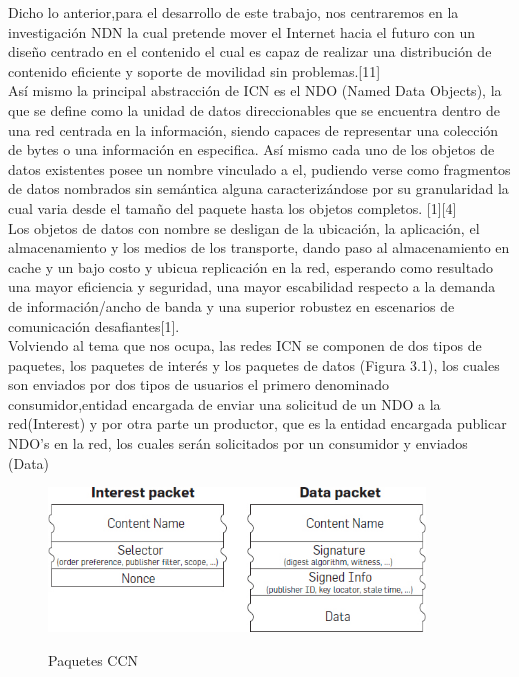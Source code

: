 \documentclass[12pt]{ociamthesis}  %
\begin{document}
Dicho lo anterior,para el desarrollo de este trabajo, nos centraremos en la investigación NDN la cual pretende mover el Internet hacia el futuro con un diseño centrado en el contenido el cual es capaz de realizar una distribución de contenido eficiente y soporte de movilidad sin problemas.[11]\\

Así mismo la principal abstracción de ICN es el NDO (Named Data Objects), la que se define como la unidad de datos direccionables que se encuentra dentro de una red centrada en la información, siendo capaces de representar una colección de bytes o una información en especifica. Así mismo cada uno de los objetos de datos existentes posee un nombre vinculado a el, pudiendo verse como fragmentos de datos nombrados sin semántica alguna caracterizándose por su granularidad la cual varia desde el tamaño del paquete hasta los objetos completos. [1][4]\\

Los objetos de datos con nombre se desligan de la ubicación, la aplicación, el almacenamiento y los medios de los transporte, dando paso al almacenamiento en cache y un bajo costo y ubicua replicación en la red, esperando como resultado una mayor eficiencia y seguridad, una mayor escabilidad respecto a la demanda de información/ancho de banda y una superior robustez en escenarios de comunicación desafiantes[1].\\

Volviendo al tema que nos ocupa, las redes ICN se componen de dos tipos de paquetes, los paquetes de interés y los paquetes de datos (Figura 3.1), los cuales son enviados por dos tipos de usuarios el primero denominado consumidor,entidad encargada de enviar una solicitud de un NDO a la red(Interest) y por otra parte un productor, que es la entidad encargada publicar NDO's en la red, los cuales serán solicitados por un consumidor y enviados (Data)\\

	\begin{figure}[h]
		\centering
		\includegraphics[width=10cm]{Paquetes_CCN.jpg}\\
		\caption{Paquetes CCN}
		\label{fig:mesh1}
	\end{figure}
 
\end{document}
